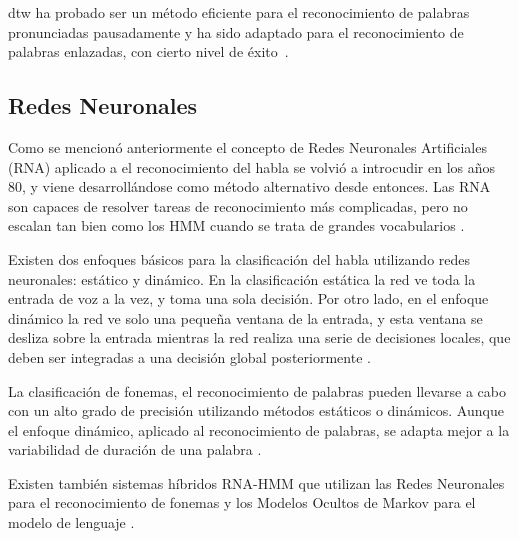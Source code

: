 \gls{dtw} ha probado ser un m\'etodo eficiente para el reconocimiento de palabras pronunciadas 
pausadamente \cite{MyersALevel1981} y ha sido adaptado para el reconocimiento de palabras enlazadas,
con cierto nivel de \mbox{\'exito \cite{MyersALevel1981, SakoeTwoLevel1979, RabinerApplication1980}}.

\subsection{Redes Neuronales}
\label{sec:otrosModelosANN}

Como se mencion\'o anteriormente el concepto de Redes Neuronales Artificiales (RNA) aplicado a el reconocimiento
del habla se volvi\'o a introcudir en los a\~nos 80, 
y viene desarroll\'andose como m\'etodo alternativo desde entonces. Las RNA son capaces de resolver tareas de reconocimiento
m\'as complicadas, pero no escalan tan bien como los HMM cuando se trata de grandes vocabularios \cite{VimalaReview2012}.

Existen dos enfoques b\'asicos para la clasificaci\'on del habla utilizando redes neuronales: est\'atico y din\'amico. En la
clasificaci\'on est\'atica la red ve toda la entrada de voz a la vez, y toma una sola decisi\'on. Por otro lado, en el enfoque
din\'amico la red ve solo una peque\~na ventana de la entrada, y esta ventana se desliza sobre la entrada mientras la red
realiza una serie de decisiones locales, que deben ser integradas a una decisi\'on global posteriormente \cite{TebelskisSpeech1995}.

La clasificaci\'on de fonemas, el reconocimiento de palabras pueden llevarse a cabo con un alto
grado de precisi\'on utilizando m\'etodos est\'aticos o din\'amicos. Aunque el enfoque din\'amico, aplicado al reconocimiento de
palabras, se adapta mejor a la variabilidad de duraci\'on de una palabra \cite{TebelskisSpeech1995}.

Existen tambi\'en sistemas h\'ibridos RNA-HMM que utilizan las Redes Neuronales para el reconocimiento de fonemas y los Modelos
Ocultos de Markov para el modelo de lenguaje \cite{VimalaReview2012}.
